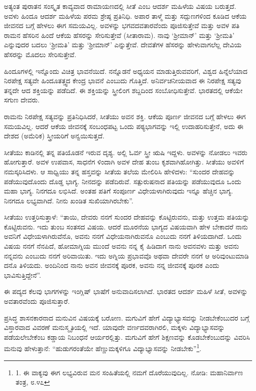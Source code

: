 ಅತ್ಯಂತ ಪುರಾತನ ಸಂಸ್ಕೃತ ಕಾವ್ಯವಾದ ರಾಮಾಯಣದಲ್ಲಿ ಸೀತೆ ಎಂಬ ಆದರ್ಶ ಮಹಿಳೆಯ ವಿಷಯ ಬರುತ್ತದೆ. ಅವಳು ಹಿಂದೂ ಆದರ್ಶ ಮಹಿಳೆಯ ಪರಮ ಶ್ರೇಷ್ಠ ಪ್ರತಿನಿಧಿ. ಅಪಾರ ತಾಳ್ಮೆ ಮತ್ತು ಸದ್ಗುಣಗಳಿಂದ ಕೂಡಿದ ಆಕೆಯ ಜೀವನದ ಬಗ್ಗೆ ಹೇಳಲು ಈಗ ಸಮಯವಿಲ್ಲ. ಅವಳನ್ನು ಭಗವದವತಾರವೆಂದು ಪೂಜಿಸುತ್ತೇವೆ ಮತ್ತು ಅವಳ ಪತಿ ರಾಮನ ಹೆಸರಿನ ಹಿಂದೆ ಆಕೆಯ ಹೆಸರನ್ನು ಸೇರಿಸುತ್ತೇವೆ (ಸೀತಾರಾಮ). ನಾವು ‘ಶ‍್ರೀಮಾನ್’ ಮತ್ತು ‘ಶ‍್ರೀಮತಿ’ ಎನ್ನುವುದರ ಬದಲು ‘ಶ‍್ರೀಮತಿ’ ಮತ್ತು ‘ಶ‍್ರೀಮಾನ್’ ಎನ್ನುತ್ತೇವೆ. ದೇವತೆಗಳ ಹೆಸರನ್ನು ಹೇಳುವಾಗಲೆಲ್ಲ ದೇವಿಯ ಹೆಸರನ್ನು ಮೊದಲು ಸೇರಿಸುತ್ತೇವೆ.

ಹಿಂದೂಗಳಲ್ಲಿ ಇನ್ನೊಂದು ವಿಚಿತ್ರ ಭಾವನೆಯಿದೆ. ನನ್ನೊಡನೆ ಅಧ್ಯಯನ ಮಾಡುತ್ತಿರುವವರಿಗೆ, ವಿಶ್ವದ ಹಿನ್ನೆಲೆಯಾದ ನಿರಪೇಕ್ಷ ಸತ್ಯವೇ ಹಿಂದೂತತ್ತ್ವದ ಕೇಂದ್ರ ಭಾವನೆ ಎಂಬುದು ಗೊತ್ತಿದೆ. ಅನಿರ್ವಚನೀಯವಾದ ಈ ನಿರಪೇಕ್ಷ ಸತ್ಯವು ತನ್ನದೇ ಆದ ಶಕ್ತಿಯನ್ನು ಪಡೆದಿದೆ. ಈ ಶಕ್ತಿಯನ್ನು ಸ್ತ್ರೀಲಿಂಗ ಶಬ್ದದಿಂದ ಸಂಬೋಧಿಸುತ್ತೇವೆ. ಭಾರತದಲ್ಲಿ ಆಕೆಯೇ ಸಗುಣ ದೇವರು.

ರಾಮನು ನಿರಪೇಕ್ಷ ಸತ್ಯವನ್ನು ಪ್ರತಿನಿಧಿಸಿದರೆ, ಸೀತೆಯು ಅವನ ಶಕ್ತಿ. ಆಕೆಯ ಪೂರ್ಣ ಜೀವನದ ಬಗ್ಗೆ ಹೇಳಲು ಈಗ ಸಮಯವಿಲ್ಲ. ಆದರೆ ಆಕೆಯ ಜೀವನಕ್ಕೆ ಸಂಬಂಧಪಟ್ಟ ಒಂದು ಪಠ್ಯಭಾಗವನ್ನು ಇಲ್ಲಿ ಉದಾಹರಿಸುತ್ತೇನೆ, ಅದು ಈ ದೇಶದ (ಅಮೆರಿಕ) ಸ್ತ್ರೀಯರಿಗೆ ಅನ್ವಯಿಸುತ್ತದೆ.

ಸೀತೆಯು ಕಾಡಿನಲ್ಲಿ ತನ್ನ ಪತಿಯೊಡನೆ ಇರುವ ದೃಶ್ಯ. ಅಲ್ಲಿ ಓರ್ವ ಸ್ತ್ರೀ ಋಷಿ ಇದ್ದಳು. ಅವಳನ್ನು ನೋಡಲು ಇವರು ಹೋಗುತ್ತಾರೆ. ಅವಳ ಉಪವಾಸ, ಸಾಧನೆಗ ಳಿಂದಾಗಿ ಅವಳ ದೇಹ ತುಂಬ ಕೃಶವಾಗಿಹೋಗಿತ್ತು. ಸೀತೆಯು ಅವಳಿಗೆ ನಮಸ್ಕರಿಸಿದಳು. ಆ ಸಾಧ್ವಿಯು ತನ್ನ ಹಸ್ತವನ್ನು ಸೀತೆಯ ತಲೆಯ ಮೇಲಿರಿಸಿ ಹೇಳಿದಳು: “ಸುಂದರ ದೇಹವನ್ನು ಪಡೆಯುವುದೊಂದು ದೊಡ್ಡ ಭಾಗ್ಯ. ನೀನದನ್ನು ಪಡೆದಿರುವೆ. ಸತ್ಪುರುಷನಾದ ಪತಿಯನ್ನು ಪಡೆಯುವುದೂ ಒಂದು ಮಹಾ ಭಾಗ್ಯ. ನಿನಗದೂ ಲಭಿಸಿದೆ. ಅಂತಹ ಪತಿಗೆ ಸಂಪೂರ್ಣ ವಿಧೇಯಳಾಗಿರುವುದು ಇನ್ನೂ ಹೆಚ್ಚಿನ ಭಾಗ್ಯ. ನಿನಗದೂ ಲಭ್ಯವಾಗಿದೆ. ನೀನು ಖಂಡಿತ ಸುಖಿಯಾಗಿರಬೇಕು”.

ಸೀತೆಯು ಉತ್ತರಿಸುತ್ತಾಳೆ: “ತಾಯಿ, ದೇವರು ನನಗೆ ಸುಂದರ ದೇಹವನ್ನು ಕೊಟ್ಟಿರುವನು, ಮತ್ತು ಉತ್ತಮ ಪತಿಯನ್ನು ಕೊಟ್ಟಿರುವನು. ಇದು ತುಂಬ ಸಂತಸದ ವಿಷಯ. ಆದರೆ ಮೂರನೆಯ ಭಾಗ್ಯದ ವಿಷಯವಾಗಿ ಹೇಳ ಬೇಕಾದರೆ ನಾನು ಅವನಿಗೆ ವಿಧೇಯಳಾಗಿರುವೆನೊ, ಅವನು ನನಗೆ ವಿಧೇಯನಾಗಿರುವನೊ ಎಂಬುದು ನನಗೆ ತಿಳಿಯದಾಗಿದೆ. ಒಂದು ವಿಷಯ ನನಗೆ ನೆನಪಿದೆ, ಹೋಮಾಗ್ನಿಯ ಮುಂದೆ ಅವನು ನನ್ನ ಕೈ ಹಿಡಿದಾಗ ನಾನು ಅವನವಳು ಮತ್ತು ಅವನು ನನ್ನವನು ಎಂಬುದು ನನಗೆ ಅರಿವಾಯಿತು. ಇದು ಅಗ್ನಿಯ ಪ್ರಭಾವವೊ ಅಥವಾ ದೇವರೇ ನನಗೆ ಆ ಅರಿವುಂಟುಮಾಡಿ ದನೊ ತಿಳಿಯದು. ಅಂದಿನಿಂದ ನಾನು ಅವನ ಜೀವನಕ್ಕೆ ಪೂರಕ, ಅವನು ನನ್ನ ಜೀವನಕ್ಕೆ ಪೂರಕ ಎಂದು ಭಾವಿಸುತ್ತಿದ್ದೇನೆ”.

ಈ ಪದ್ಯದ ಕೆಲವು ಭಾಗಗಳನ್ನು ಇಂಗ್ಲಿಷ್ ಭಾಷೆಗೆ ಅನುವಾದಿಸಲಾಗಿದೆ. ಭಾರತದ ಆದರ್ಶ ಮಹಿಳೆ ಸೀತೆ, ಅವಳನ್ನು ಅವತಾರವೆಂದು ಪೂಜಿಸುತ್ತಾರೆ.

ಪ್ರಸಿದ್ಧ ಶಾಸನಕಾರನಾದ ಮನುವಿನ ವಿಷಯಕ್ಕೆ ಬರೋಣ. ಮಗುವಿಗೆ ಹೇಗೆ ವಿದ್ಯಾಭ್ಯಾಸವನ್ನು ನೀಡಬೇಕೆಂಬುದರ ಬಗ್ಗೆ ವಿಸ್ತಾರವಾದ ವಿವರಣೆ ಮನುಸ್ಮೃತಿಯಲ್ಲಿ ಇದೆ. ಯಾವುದೇ ವರ್ಣದವರಾಗಿರಲಿ, ಮಕ್ಕಳು ವಿದ್ಯಾಭ್ಯಾಸವನ್ನು ಪಡೆಯಲೇಬೇಕೆಂಬ ಕಡ್ಡಾಯ ನಿಬಂಧನೆ ಆರ್ಯರಲ್ಲಿತ್ತು. ಮಗುವಿಗೆ ಹೇಗೆ ಶಿಕ್ಷಣವನ್ನು ಕೊಡಬೇಕೆಂಬುದನ್ನು ವಿವರಿಸಿ ಮನುವು ಹೇಳುತ್ತಾನೆ: “ಹುಡುಗರಂತೆಯೇ ಹೆಣ್ಣುಮಕ್ಕಳಿಗೂ ವಿದ್ಯಾಭ್ಯಾಸವನ್ನು ನೀಡಬೇಕು”\footnote{1. ಈ ವಾಕ್ಯವು ಈಗ ಲಭ್ಯವಿರುವ ಮನ ಸಂಹಿತೆಯಲ್ಲಿ ನಮಗೆ ದೊರೆಯುವುದಿಲ್ಲ. ನೋಡಿ: ಮಹಾನಿರ್ವಾಣ ತಂತ್ರ, ೮.೪೭}.

